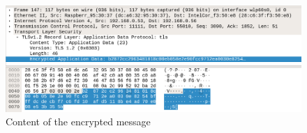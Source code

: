 \documentclass[a4paper,12pt]{article}
\begin{document}
\begin{figure}[H]
    \centering
    \includegraphics[scale=0.27]{test/examples/client-server/encrypted_data.png}
    \caption{Content of the encrypted message}
    
\end{figure}

\end{document}
